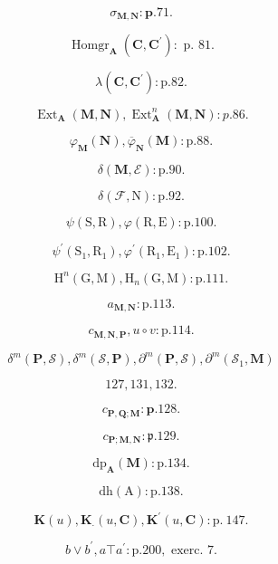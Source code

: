 \[
\sigma_ {\mathbf {M}, \mathbf {N}}: \mathbf {p}. 7 1.
\]

\[
\operatorname{Homgr} _ {\mathbf {A}} (\mathbf {C}, \mathbf {C} ^ {\prime}): \text { p. } 8 1.
\]

\[
\lambda (\mathbf {C}, \mathbf {C} ^ {\prime}): \mathrm{p.} 8 2.
\]

\[
\operatorname{Ext} _ {\mathbf {A}} (\mathbf {M}, \mathbf {N}), \operatorname{Ext} _ {\mathbf {A}} ^ {n} (\mathbf {M}, \mathbf {N}): p. 8 6.
\]

\[
\varphi_ {\mathbf {M}} (\mathbf {N}), \overline {{\varphi}} _ {\mathbf {N}} (\mathbf {M}): \mathrm{p.} 8 8.
\]

\[
\delta (\mathbf {M}, \mathcal {E}): \mathrm{p.} 9 0.
\]

\[
\delta (\mathcal {F}, \mathrm{N}): \mathrm{p.} 9 2.
\]

\[
\psi (\mathrm{S}, \mathrm{R}), \varphi (\mathrm{R}, \mathrm{E}): \mathrm{p}. 1 0 0.
\]

\[
\psi^ {\prime} \left(\mathrm{S} _ {1}, \mathrm{R} _ {1}\right), \varphi^ {\prime} \left(\mathrm{R} _ {1}, \mathrm{E} _ {1}\right): \mathrm{p}. 1 0 2.
\]

\[
\mathrm{H} ^ {n} (\mathrm{G}, \mathrm{M}), \mathrm{H} _ {n} (\mathrm{G}, \mathrm{M}): \mathrm{p}. 1 1 1.
\]

\[
a _ {\mathbf {M}, \mathbf {N}}: \mathrm{p.} 1 1 3.
\]

\[
c _ {\mathbf {M}, \mathbf {N}, \mathbf {P}}, u \circ v: \mathrm{p}. 1 1 4.
\]

\[
\delta^ {m} (\mathbf {P}, \mathcal {S}), \delta^ {m} (\mathcal {S}, \mathbf {P}), \partial^ {m} (\mathbf {P}, \mathcal {S}), \partial^ {m} (\mathcal {S} _ {1}, \mathbf {M})
\]

\[
1 2 7, 1 3 1, 1 3 2.
\]

\[
c _ {\mathbf {P}, \mathbf {Q}; \mathbf {M}}: \mathbf {p}. 1 2 8.
\]

\[
c _ {\mathbf {P}; \mathbf {M}, \mathbf {N}}: \mathfrak {p}. 1 2 9.
\]

\[
\mathrm{dp} _ {\mathbf {A}} (\mathbf {M}): \mathrm{p}. 1 3 4.
\]

\[
\mathrm{dh} (\mathrm{A}): \mathrm{p}. 1 3 8.
\]

\[
\mathbf {K} (u), \mathbf {K} _ {\cdot} (u, \mathbf {C}), \mathbf {K} ^ {\prime} (u, \mathbf {C}): \mathrm{p.~147.}
\]

\[
b \vee b ^ {\prime}, a \top a ^ {\prime}: \mathrm{p.} 2 0 0, \text {   exerc.   } 7.
\]

